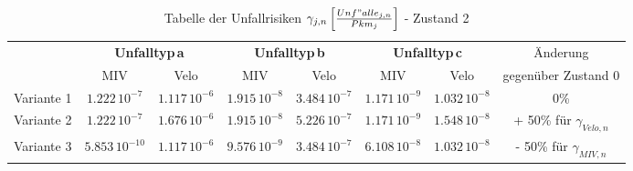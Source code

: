 %
%
%
%

\begin{table}[h!]
\scriptsize
\flushleft
\renewcommand{\arraystretch}{1.2} 
%
%
\begin{tabular}{@{} lccccccc @{}}  \\  
\toprule 
           & \multicolumn{2}{c}{\textbf{Unfalltyp\,a}} & \multicolumn{2}{c}{\textbf{Unfalltyp\,b}} & \multicolumn{2}{c}{\textbf{Unfalltyp\,c}} & Änderung  \\
           & MIV       & Velo      & MIV       & Velo      & MIV       & Velo    &  gegenüber Zustand 0 \\
\midrule
Variante 1&\(1.222\,\mathrm{10^{-7}}\)&\(1.117\,\mathrm{10^{-6}}\)&\(1.915\,\mathrm{10^{-8}}\)&\(3.484\,\mathrm{10^{-7}}\)&\(1.171\,\mathrm{10^{-9}}\)&\(1.032\,\mathrm{10^{-8}}\)& 0\% \\
Variante 2 &\(1.222\,\mathrm{10^{-7}}\)&\(1.676\,\mathrm{10^{-6}}\)&\(1.915\,\mathrm{10^{-8}}\)&\(5.226\,\mathrm{10^{-7}}\)&\(1.171\,\mathrm{10^{-9}}\)&\(1.548\,\mathrm{10^{-8}}\)& + 50\% für \(\gamma_{Velo,n}\)    \\
Variante 3 &\(5.853\,\mathrm{10^{-10}}\)&\(1.117\,\mathrm{10^{-6}}\)&\(9.576\,\mathrm{10^{-9}}\)&\(3.484\,\mathrm{10^{-7}}\)&\(6.108\,\mathrm{10^{-8}}\)&\(1.032\,\mathrm{10^{-8}}\)& - 50\% für \(\gamma_{MIV,n}\) 		\\
\bottomrule
\end{tabular}
\caption[Tabelle der Unfallrisiken - Zustand 2]{Tabelle der Unfallrisiken $\gamma_{j,n}\,\Bigl[\frac{Unf"alle_{j,n}}{Pkm_{j}}\Bigl]$ - Zustand 2}
\label{tab:t-09-01-Unfallrisiko-Zustand-2}
\end{table}





%



